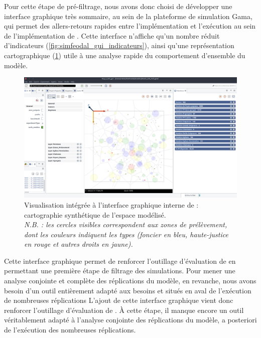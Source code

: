 Pour cette étape de pré-filtrage, nous avons donc choisi de développer une interface graphique très sommaire, au sein de la plateforme de simulation Gama, qui permet des allers-retours rapides entre l'implémentation et l'exécution au sein de l'implémentation de \simfeodal{}.
Cette interface n'affiche qu'un nombre réduit d'indicateurs (\cref{fig:simfeodal_gui_indicateurs}), ainsi qu'une représentation cartographique (\cref{fig:simfeodal_gui_carte}) utile à une analyse rapide du comportement d'ensemble du modèle.

\begin{figure}[H]
	\captionsetup{width=\linewidth}
	\includegraphics[width=\linewidth]{img/SimFeodal_GUI_carte.png}
	\caption[Visualisation intégrée à l'interface graphique interne de \simfeodal{}.]{Visualisation intégrée à l'interface graphique interne de \simfeodal{} : cartographie synthétique de l'espace modélisé.\\
	\textit{N.B. : les cercles visibles correspondent aux zones de prélèvement, dont les couleurs indiquent les types (foncier en bleu, haute-justice en rouge et autres droits en jaune).}}
	\label{fig:simfeodal_gui_carte}
\end{figure}


Cette interface graphique permet de renforcer l'outillage d'évaluation de \simfeodal{} en permettant une première étape de filtrage des simulations.
Pour mener une analyse conjointe et complète des réplications du modèle, en revanche, nous avons besoin d'un outil entièrement adapté aux besoins et situés en aval de l'exécution de nombreuses réplications
L'ajout de cette interface graphique vient donc renforcer l'outillage d'évaluation de \simfeodal{}.
À cette étape, il manque encore un outil véritablement adapté à l'analyse conjointe des réplications du modèle, a posteriori de l'exécution des nombreuses réplications.

